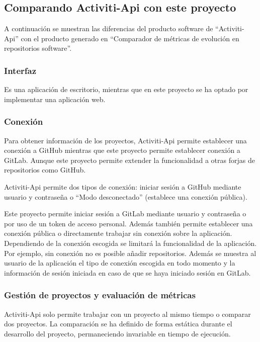 \subsection{Comparando Activiti-Api con este proyecto}

A continuación se muestran las diferencias del producto software de ``Activiti-Api'' con el producto generado en ``Comparador de métricas de evolución en repositorios software''.

\subsubsection{Interfaz}

Es una aplicación de escritorio, mientras que en este proyecto se ha optado por implementar una aplicación web.

\subsubsection{Conexión}

Para obtener información de los proyectos, Activiti-Api permite establecer una conexión a GitHub mientras que este proyecto permite establecer conexión a GitLab. Aunque este proyecto permite extender la funcionalidad a otras forjas de repositorios como GitHub.

Activiti-Api permite dos tipos de conexión: iniciar sesión a GitHub mediante usuario y contraseña o ``Modo desconectado'' (establece una conexión pública). 

Este proyecto permite iniciar sesión a GitLab mediante usuario y contraseña o por uso de un token de acceso personal. Además también permite establecer una conexión pública o directamente trabajar sin conexión sobre la aplicación. Dependiendo de la conexión escogida se limitará la funcionalidad de la aplicación. Por ejemplo, sin conexión no es posible añadir repositorios. Además se muestra al usuario de la aplicación el tipo de conexión escogida en todo momento y la información de sesión iniciada en caso de que se haya iniciado sesión en GitLab.

\subsubsection{Gestión de proyectos y evaluación de métricas}

Activiti-Api solo permite trabajar con un proyecto al mismo tiempo o comparar dos proyectos. La comparación se ha definido de forma estática durante el desarrollo del proyecto, permaneciendo invariable en tiempo de ejecución.

